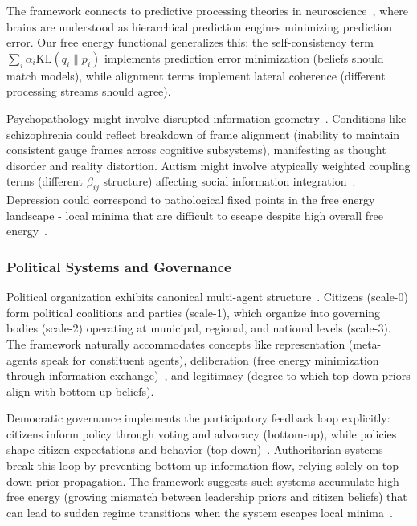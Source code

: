 \documentclass[11pt]{article}
\begin{document}
The framework connects to predictive processing theories in neuroscience~\cite{Friston2010predictive,Clark2013,Hohwy2013}, where brains are understood as hierarchical prediction engines minimizing prediction error. Our free energy functional generalizes this: the self-consistency term $\sum_i \alpha_i \mathrm{KL}(q_i \| p_i)$ implements prediction error minimization (beliefs should match models), while alignment terms implement lateral coherence (different processing streams should agree).

Psychopathology might involve disrupted information geometry~\cite{Friston2014psychopathology,Adams2013}. Conditions like schizophrenia could reflect breakdown of frame alignment (inability to maintain consistent gauge frames across cognitive subsystems), manifesting as thought disorder and reality distortion. Autism might involve atypically weighted coupling terms (different $\beta_{ij}$ structure) affecting social information integration~\cite{Pellicano2012}. Depression could correspond to pathological fixed points in the free energy landscape - local minima that are difficult to escape despite high overall free energy~\cite{Badcock2017}.

\subsubsection{Political Systems and Governance}

Political organization exhibits canonical multi-agent structure~\cite{Ostrom1990,Axelrod1997}. Citizens (scale-0) form political coalitions and parties (scale-1), which organize into governing bodies (scale-2) operating at municipal, regional, and national levels (scale-3). The framework naturally accommodates concepts like representation (meta-agents speak for constituent agents), deliberation (free energy minimization through information exchange)~\cite{Habermas1984,Dryzek2000}, and legitimacy (degree to which top-down priors align with bottom-up beliefs).

Democratic governance implements the participatory feedback loop explicitly: citizens inform policy through voting and advocacy (bottom-up), while policies shape citizen expectations and behavior (top-down)~\cite{Dahl1989}. Authoritarian systems break this loop by preventing bottom-up information flow, relying solely on top-down prior propagation. The framework suggests such systems accumulate high free energy (growing mismatch between leadership priors and citizen beliefs) that can lead to sudden regime transitions when the system escapes local minima~\cite{Kuran1991}.
\end{document}
